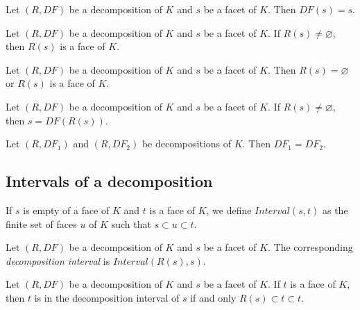 \begin{sublemma}
Let $(R,DF)$ be a decomposition of $K$ and $s$ be a facet of $K$. Then $DF(s)=s$.

\end{sublemma}

\begin{sublemma}
Let $(R,DF)$ be a decomposition of $K$ and $s$ be a facet of $K$. If $R(s)\ne\varnothing$, then
$R(s)$ is a face of $K$.

\end{sublemma}

\begin{sublemma}
Let $(R,DF)$ be a decomposition of $K$ and $s$ be a facet of $K$. Then $R(s)=\varnothing$ or
$R(s)$ is a face of $K$.

\end{sublemma}

\begin{sublemma}
Let $(R,DF)$ be a decomposition of $K$ and $s$ be a facet of $K$. If $R(s)\ne\varnothing$, then $s=DF(R(s))$.

\end{sublemma}

\begin{sublemma}
Let $(R,DF_1)$ and $(R,DF_2)$ be decompositions of $K$. Then $DF_1=DF_2$.

\end{sublemma}


\subsection{Intervals of a decomposition}

\begin{subdefi}[Interval]
If $s$ is empty of a face of $K$ and $t$ is a face of $K$, we define $Interval(s,t)$ as the finite set of faces $u$ of $K$
such that $s\subset u\subset t$.

\end{subdefi}

\begin{subdefi}[DecompositionInterval]
Let $(R,DF)$ be a decomposition of $K$ and $s$ be a facet of $K$. The corresponding \emph{decomposition interval}
is $Interval(R(s),s)$.

\end{subdefi}

\begin{subdefi}
Let $(R,DF)$ be a decomposition of $K$ and $s$ be a facet of $K$. If $t$ is a face of $K$, then $t$ is in the decomposition
interval of $s$ if and only $R(s)\subset t\subset t$.

\end{subdefi}

